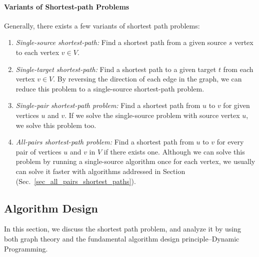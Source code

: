 \documentclass[../main.tex]{subfiles}
\begin{document}
\paragraph{Variants of Shortest-path Problems} Generally, there exists a few variants of shortest path problems:
\begin{enumerate}
    \item \textit{Single-source shortest-path:} Find a shortest path from a given source $s$ vertex to each vertex $v \in V$.
    \item \textit{Single-target shortest-path:} Find a shortest path to a given target $t$ from each vertex  $v \in V$. By reversing the direction of each edge in the graph, we can reduce this problem to a single-source shortest-path problem.
    \item \textit{Single-pair shortest-path problem:} Find a shortest path from $u$ to $v$ for given vertices $u$ and $v$. If we solve the single-source problem with source vertex $u$, we solve this problem too. %
    \item \textit{All-pairs shortest-path problem:} Find a shortest path from $u$ to $v$ for every pair of vertices $u$ and $v$ in $V$ if there exists one. Although we can solve this problem by running a single-source algorithm once for each vertex, we usually can solve it faster with algorithms addressed in Section (Sec.~\ref{sec_all_pairs_shortest_paths}).
\end{enumerate}


\subsection{Algorithm Design}
\label{chapter_advanced_graph_sec_algorithm_design}
In this section, we discuss the shortest path problem, and analyze it by using both graph theory and  the fundamental algorithm design principle--Dynamic Programming. 
\end{document}

